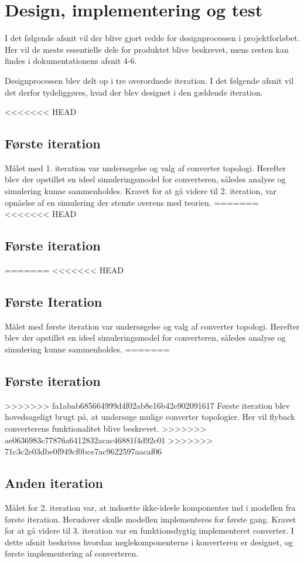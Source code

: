 \chapter{Design, implementering og test}
I det følgende afsnit vil der blive gjort redde for designprocessen i projektforløbet. Her vil de meste essentielle dele for produktet blive beskrevet, mens resten kan findes i dokumentationens afsnit 4-6.

Designprocessen blev delt op i tre overordnede iteration. I det følgende afsnit vil det derfor tydeliggøres, hvad der blev designet i den gældende iteration. 

<<<<<<< HEAD
\section{Første iteration}
Målet med 1. iteration var undersøgelse og valg af converter topologi. Herefter blev der opstillet en ideel simuleringsmodel for converteren, således analyse og simulering kunne sammenholdes. 
Kravet for at gå videre til 2. iteration, var opnåelse af en simulering der stemte overens med teorien. 
=======
<<<<<<< HEAD
\section{Første iteration} 
=======
<<<<<<< HEAD
\section{Første Iteration}
Målet med første iteration var undersøgelse og valg af converter topologi. Herefter blev der opstillet en ideel simuleringsmodel for converteren, således analyse og simulering kunne sammenholdes. 
=======
\section{Første iteration}
>>>>>>> fa1abab685664999d4f02ab8e16b42e902091617
Første iteration blev hovedsageligt brugt på, at undersøge mulige converter topologier. Her vil flyback converterens funktionalitet blive beskrevet. 
>>>>>>> ae0636983c77876a6412832acac46881f4d92c01
>>>>>>> 71c3c2e03dbe0f949cf0bce7ac9622597aacaf06




\section{Anden iteration}
Målet for 2. iteration var, at indsætte ikke-ideele komponenter ind i modellen fra første iteration. Herudover skulle modellen implementeres for første gang. 
Kravet for at gå videre til 3. iteration var en funktionsdygtig implementeret converter. 
I dette afsnit beskrives hvordan nøglekomponenterne i konverteren er designet, og første implementering af converteren.

